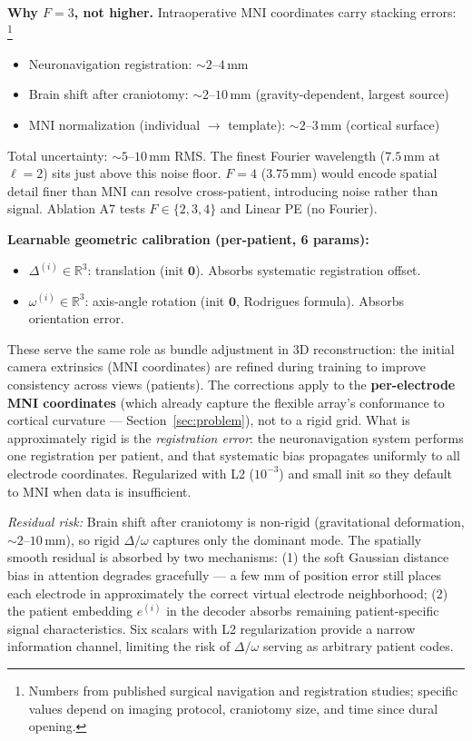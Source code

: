 \documentclass[11pt,letterpaper]{article}
\newcommand{\R}{\mathbb{R}}
\begin{document}
\textbf{Why $F{=}3$, not higher.} Intraoperative MNI coordinates carry stacking errors:%
\footnote{Numbers from published surgical navigation and registration studies; specific values depend on imaging protocol, craniotomy size, and time since dural opening.}
\begin{itemize}[leftmargin=2em]
\item Neuronavigation registration: ${\sim}2$--$4$\,mm
\item Brain shift after craniotomy: ${\sim}2$--$10$\,mm (gravity-dependent, largest source)
\item MNI normalization (individual $\to$ template): ${\sim}2$--$3$\,mm (cortical surface)
\end{itemize}
Total uncertainty: ${\sim}5$--$10$\,mm RMS. The finest Fourier wavelength ($7.5$\,mm at $\ell{=}2$) sits just above this noise floor. $F{=}4$ ($3.75$\,mm) would encode spatial detail finer than MNI can resolve cross-patient, introducing noise rather than signal. Ablation A7 tests $F \in \{2, 3, 4\}$ and Linear PE (no Fourier).

\textbf{Learnable geometric calibration (per-patient, 6 params):}
\begin{itemize}[leftmargin=2em]
\item $\Delta^{(i)} \in \R^3$: translation (init $\mathbf{0}$). Absorbs systematic registration offset.
\item $\omega^{(i)} \in \R^3$: axis-angle rotation (init $\mathbf{0}$, Rodrigues formula). Absorbs orientation error.
\end{itemize}
These serve the same role as bundle adjustment in 3D reconstruction: the initial camera extrinsics (MNI coordinates) are refined during training to improve consistency across views (patients). The corrections apply to the \textbf{per-electrode MNI coordinates} (which already capture the flexible array's conformance to cortical curvature --- Section~\ref{sec:problem}), not to a rigid grid. What is approximately rigid is the \textit{registration error}: the neuronavigation system performs one registration per patient, and that systematic bias propagates uniformly to all electrode coordinates. Regularized with L2 ($10^{-3}$) and small init so they default to MNI when data is insufficient.

\textcolor{BrickRed}{\textit{Residual risk:}} Brain shift after craniotomy is non-rigid (gravitational deformation, ${\sim}2$--$10$\,mm), so rigid $\Delta/\omega$ captures only the dominant mode. The spatially smooth residual is absorbed by two mechanisms: (1) the soft Gaussian distance bias in attention degrades gracefully --- a few mm of position error still places each electrode in approximately the correct virtual electrode neighborhood; (2) the patient embedding $e^{(i)}$ in the decoder absorbs remaining patient-specific signal characteristics. Six scalars with L2 regularization provide a narrow information channel, limiting the risk of $\Delta/\omega$ serving as arbitrary patient codes.
\end{document}
